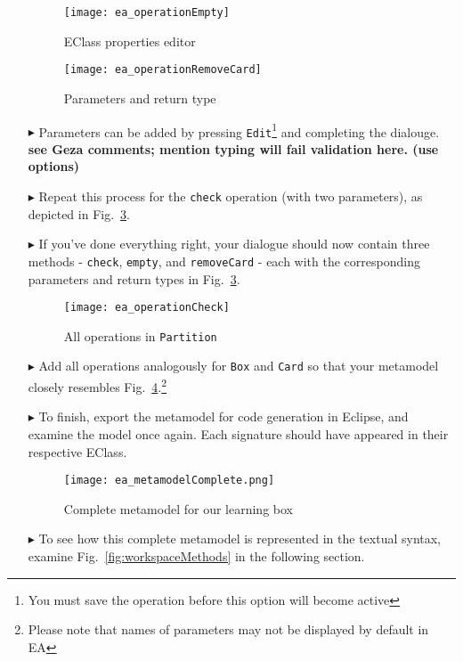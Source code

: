 \begin{enumerate}
\begin{figure}[htbp]
	\centering
  	\texttt{[image: ea\_operationEmpty]}
	\caption{EClass properties editor}
	\label{fig:operation_properties}
\end{figure}

\begin{figure}[htbp]
	\centering
  \texttt{[image: ea\_operationRemoveCard]}
	\caption{Parameters and return type}
	\label{fig:operation_parameters}
\end{figure}

\item[$\blacktriangleright$] Parameters can be added by pressing \texttt{Edit}\footnote{You must save the operation before this option will become active} and
completing the dialouge. {\bf \small see Geza comments; mention typing will fail validation here. (use options)}

\item[$\blacktriangleright$] Repeat this process for the \texttt{check} operation (with two parameters), as depicted in Fig.~\ref{fig:operation_partition}. 

\item[$\blacktriangleright$] If you've done everything right, your dialogue should now contain three methods - \texttt{check}, \texttt{empty}, and
\texttt{removeCard} - each with the corresponding parameters and return types in Fig.~\ref{fig:operation_partition}.

\begin{figure}[htbp]
	\centering
  \texttt{[image: ea\_operationCheck]}
	\caption{All operations in \texttt{Partition}}
	\label{fig:operation_partition}
\end{figure}

\item[$\blacktriangleright$] Add all operations analogously for \texttt{Box} and \texttt{Card} so that your metamodel closely resembles
Fig.~\ref{fig:metamodel_complete}.\footnote{Please note that names of parameters may not be displayed by default in EA}

\item[$\blacktriangleright$] To finish, export the metamodel for code generation in Eclipse, and examine the model once again. Each signature should have
appeared in their respective EClass.

\begin{figure}[htbp]
	\centering
  \texttt{[image: ea\_metamodelComplete.png]}
\caption[Complete metamodel for our learning box.]{Complete metamodel for our learning box}
	\label{fig:metamodel_complete}
\end{figure}

\item[$\blacktriangleright$] To see how this complete metamodel is represented in the textual syntax, examine Fig.~\ref{fig:workspaceMethods} in the following
section. 

\end{enumerate}

